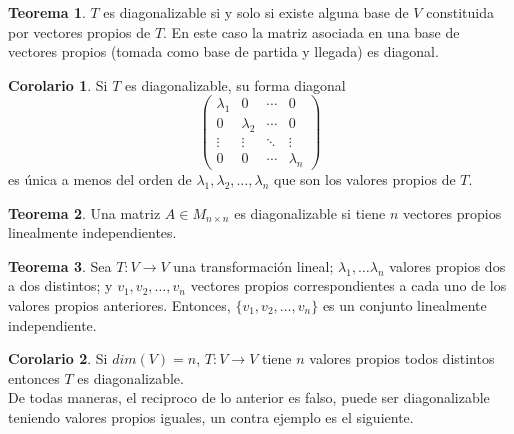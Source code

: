 \documentclass[10pt]{article}
\theoremstyle{definition}
\newtheorem{theorem}{Teorema}[section]
\newtheorem{corollary}{Corolario}[theorem]
\begin{document}
\begin{theorem}
	$T$ es diagonalizable si y solo si existe alguna base de $V$ constituida por vectores propios de $T$. En este caso la matriz asociada en una base de vectores propios (tomada como base de partida y llegada) es diagonal.
\end{theorem}
\begin{corollary}
	Si $T$ es diagonalizable, su forma diagonal
	$$\begin{pmatrix}
			\lambda _{1} & 0            & \cdots & 0            \\
			0            & \lambda _{2} & \cdots & 0            \\
			\vdots       & \vdots       & \ddots & \vdots       \\
			0            & 0            & \cdots & \lambda _{n}
		\end{pmatrix}$$
	es única a menos del orden de $\lambda _1, \lambda _2, \dots, \lambda _n$ que son los valores propios de $T$.
\end{corollary}
\begin{theorem}
	Una matriz $A\in M_{n\times n}$ es diagonalizable si tiene $n$ vectores propios linealmente independientes.
\end{theorem}
\begin{theorem}
	Sea $T:V\to V$ una transformación lineal; $\lambda _1, \dots \lambda _n$ valores propios dos a dos distintos; y $v_1, v_2, \dots, v_n$ vectores propios correspondientes a cada uno de los valores propios anteriores. Entonces, $\{v_1,v_2,\dots,v_n\}$ es un conjunto linealmente independiente.
\end{theorem}
\begin{corollary}
	Si $dim(V)=n$, $T:V\to V$ tiene $n$ valores propios todos distintos entonces $T$ es diagonalizable.\\
	De todas maneras, el reciproco de lo anterior es falso, puede ser diagonalizable teniendo valores propios iguales, un contra ejemplo es el siguiente.
\end{corollary}\newpage
\end{document}
